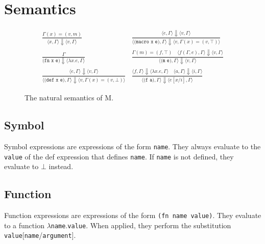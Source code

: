 \documentclass[11pt]{article}
\begin{document}
    \section{Semantics}\label{sec:semantics}

    \begin{figure*}[h]
        \centering
        \begin{align*}
            &\frac{\Gamma(x)=(v,m)}{\langle x,\Gamma\rangle\Downarrow\langle v,\Gamma\rangle}
            &\frac{\langle e,\Gamma\rangle\Downarrow\langle v,\Gamma\rangle}{\langle\texttt{(macro x e)},\Gamma\rangle\Downarrow\langle v,\Gamma(x) = (v,\top)\rangle}&\\
            &\frac{\Gamma}{\texttt{(fn x e)}\Downarrow\langle\lambda x.e,\Gamma\rangle}
            &\frac{\Gamma(m)=(f,\top)\quad\langle f(\Gamma,e),\Gamma\rangle\Downarrow\langle v,\Gamma\rangle}{\langle\texttt{(m e)},\Gamma\rangle\Downarrow\langle v,\Gamma\rangle}&\\
            &\frac{\langle e,\Gamma\rangle\Downarrow\langle v,\Gamma\rangle}{\langle\texttt{(def x e)},\Gamma\rangle\Downarrow\langle v,\Gamma(x) = (v,\bot)\rangle}
            &\frac{\langle f,\Gamma\rangle\Downarrow\langle\lambda x.e,\Gamma\rangle\quad\langle a,\Gamma\rangle\Downarrow\langle i,\Gamma\rangle}{\langle\texttt{(f a)},\Gamma\rangle\Downarrow\langle e[x/i],\Gamma\rangle}&
        \end{align*}
        \caption{The natural semantics of M.}
    \end{figure*}

    \subsection{Symbol}\label{subsec:symbol}

    \begin{minipage}{\columnwidth}
        Symbol expressions are expressions of the form \texttt{name}.
        They always evaluate to the \texttt{value} of the def expression that defines \texttt{name}.
        If \texttt{name} is not defined, they evaluate to $\bot$ instead.
    \end{minipage}

    \subsection{Function}\label{subsec:function}

    \begin{minipage}{\columnwidth}
        Function expressions are expressions of the form \lstinline{(fn name value)}.
        They evaluate to a function $\lambda$\texttt{name}.\texttt{value}.
        When applied, they perform the substitution \texttt{value}[\texttt{name}/\texttt{argument}].
    \end{minipage}
\end{document}
